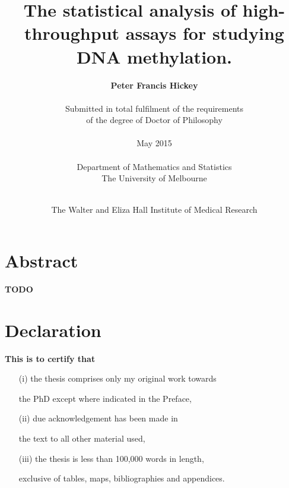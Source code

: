 \documentclass[11pt,a4paper,oneside]{book}	%
\begin{document}


\title{\huge \bf The statistical analysis of high-throughput assays
for studying DNA methylation.\\}

\author{{\bf \Large Peter Francis Hickey}\\\\
Submitted in total fulfilment of the requirements\\
of the degree of Doctor of Philosophy\\\\
May 2015\\\\
Department of Mathematics and Statistics\\
The University of Melbourne\\\\}

\date{The Walter and Eliza Hall Institute of Medical Research}

\maketitle

\frontmatter

\chapter{Abstract}


\textbf{TODO}


\chapter{Declaration}

{\bf This is to certify that}

\begin{itemize}

\item [(i)] the thesis comprises only my original work towards

the PhD except where indicated in the Preface,

\item [(ii)] due acknowledgement has been made in

the text to all other material used,

\item [(iii)] the thesis is less than 100,000 words in length,

exclusive of tables, maps, bibliographies and appendices.

\end{itemize}
\end{document}
